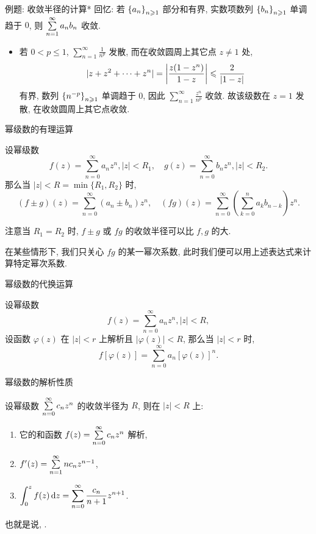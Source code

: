 \begin{frame}{例题: 收敛半径的计算*}
\onslide<+->
回忆: 若 ${\left\{a_n\right\}}_{n\geqslant 1}$ 部分和有界, 实数项数列 ${\left\{b_n\right\}}_{n\geqslant 1}$ 单调趋于 $0$, 则 $\sum\limits_{n=1}^\infty a_nb_n$ 收敛.

\begin{solutionc}
\begin{itemize}
\item 若 $0<p\le1$, $\displaystyle\sum_{n=1}^\infty\frac1{n^p}$ 发散, 
\onslide<+->
而在收敛圆周上其它点 $z\neq1$ 处,
\[|z+z^2+\cdots+z^n|=\left|\frac{z(1-z^n)}{1-z}\right|
\leqslant\frac{2}{|1-z|}\]
有界, 数列 ${\left\{n^{-p}\right\}}_{n\geqslant 1}$ 单调趋于 $0$,
\onslide<+->
因此 $\displaystyle\sum_{n=1}^\infty\frac{z^n}{n^p}$ 收敛.
\onslide<+->
故该级数在 $z=1$ 发散, 在收敛圆周上其它点收敛.
\end{itemize}
\end{solutionc}
\end{frame}


\begin{frame}{幂级数的有理运算}
\begin{theorem}
设幂级数
\[f(z)=\sum_{n=0}^\infty a_nz^n,|z|<R_1,\quad
g(z)=\sum_{n=0}^\infty b_nz^n,|z|<R_2.\]
\onslide<+->
那么当 $|z|<R=\min\{R_1,R_2\}$ 时,
\[(f\pm g)(z)=\sum_{n=0}^\infty (a_n\pm b_n)z^n,\quad
(fg)(z)=\sum_{n=0}^\infty\left(\sum_{k=0}^na_kb_{n-k}\right)z^n.\]
\end{theorem}
\onslide<+->
注意当 $R_1=R_2$ 时, $f\pm g$ 或 $fg$ 的收敛半径可以比 $f,g$ 的大.

\onslide<+->
在某些情形下, 我们只关心 $fg$ 的某一幂次系数,
\onslide<+->
此时我们便可以用上述表达式来计算特定幂次系数.
\end{frame}


\begin{frame}{幂级数的代换运算}
\begin{theorem}
设幂级数
\[f(z)=\sum_{n=0}^\infty a_nz^n,|z|<R,\]
设函数 $\varphi(z)$ 在 $|z|<r$ 上解析且 $|\varphi(z)|<R$, 
\onslide<+->
那么当 $|z|<r$ 时,
\[f[\varphi(z)]=\sum_{n=0}^\infty a_n[\varphi(z)]^n.\]
\end{theorem}
\end{frame}


\begin{frame}{幂级数的解析性质}
\begin{theorem}
设幂级数 $\sum\limits_{n=0}^\infty c_nz^n$ 的收敛半径为 $R$, 则在 $|z|<R$ 上:
\begin{enumerate}
\item 它的和函数 $f(z)=\sum\limits_{n=0}^\infty c_nz^n$ 解析,
\item $f'(z)=\sum\limits_{n=1}^\infty nc_nz^{n-1}$,
\item $\displaystyle\int_0^zf(z)\,\mathrm{d} z=\sum_{n=0}^\infty \frac{c_n}{n+1}z^{n+1}$.
\end{enumerate}
\end{theorem}
\onslide<+->
也就是说, .
\end{frame}



